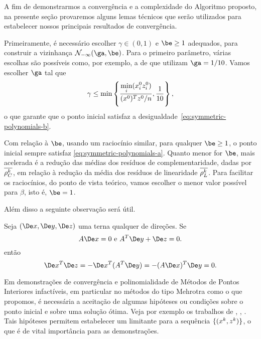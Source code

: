 A fim de demonstrarmos a convergência e a complexidade do Algoritmo proposto, na presente seção provaremos alguns lemas técnicos que serão utilizados para estabelecer nossos principais resultados de convergência. 

Primeiramente, é necessário  escolher  $\gamma\in(0,1)$  e $\be\geq 1$ adequados, para construir a vizinhança $\Nset_{-\infty}(\ga,\be)$. Para o primeiro parâmetro, várias escolhas são possíveis como, por exemplo, a de 
\textcite{Colombo:2008ia} que utilizam $\ga = 1/10$. Vamos escolher $\ga$ tal que  
\[
\gamma \leq  \min\left\{ \frac{\displaystyle \min_{i}(x^0_{i} z^0_{i} )}{(x^0 )^Tz^0 /n}, \frac{1}{10}\right\},
\]
o que garante que o ponto inicial satisfaz a desigualdade~\eqref{eq:symmetric-polynomials-b}.

Com relação à $\be$,  usando um raciocínio similar, para qualquer  $\be\geq 1$, o ponto inicial sempre satisfaz \eqref{eq:symmetric-polynomials-a}. Quanto menor for $\be$, mais acelerada é a redução  das médias dos resíduos de complementaridade, dadas por $\overline{\rho_C^{k}} $, em relação à redução da média dos resíduos de linearidade $\overline{\rho_L^{k}}$. Para facilitar os raciocínios, do ponto de vista teórico, vamos escolher o menor valor possível para $\beta$, isto é, $\be=1$.

Além disso a seguinte observação será  útil.


\begin{obs}
	Seja  $(\Dex,\Dey,\Dez)$ uma terna qualquer de direções. Se 
\begin{equation}
	\label{eq:Ax0-ATyz0}
	A\Dex=0 \text{ e } A^T\Dey + \Dez = 0.
\end{equation}
então
\begin{equation}
	\label{eq:xTziszero}
	\Dex^T\Dez =  - \Dex^T(A^T\Dey)  = -(A\Dex)^T\Dey = 0.
\end{equation}
\end{obs}



Em demonstrações de convergência e polinomialidade de Métodos de Pontos Interiores  infactíveis, em particular no métodos do tipo Mehrotra como o que propomos,  é  necessária a aceitação de algumas hipóteses ou condições sobre o ponto inicial e  sobre uma solução ótima. Veja por exemplo os trabalhos de \textcite{Wright:1994jd}, \textcite[cap. 6]{Wright:Primal-dual-interior-point:1997h}, \textcite{Wright:1996kj,Zhang:2006ic,Zhang:1994fz,Zhang:1995fu}. Tais hipóteses permitem estabelecer um limitante para a sequência $\{(x^{k},z^{k})\}$, o que é de vital importância para as demonstrações.

